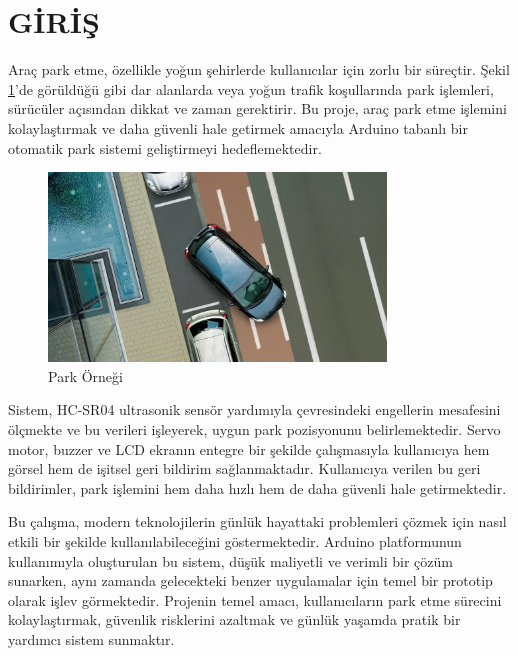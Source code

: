 \section{GİRİŞ}
    Araç park etme, özellikle yoğun şehirlerde kullanıcılar için zorlu bir süreçtir. Şekil \ref{fig:5}'de görüldüğü gibi dar alanlarda veya yoğun trafik koşullarında park işlemleri, sürücüler açısından dikkat ve zaman gerektirir. Bu proje, araç park etme işlemini kolaylaştırmak ve daha güvenli hale getirmek amacıyla Arduino tabanlı bir otomatik park sistemi geliştirmeyi hedeflemektedir.

\begin{figure}[H]
\centering
\includegraphics[width=0.80\textwidth]{Resimler/5.png}
\caption{Park Örneği}
\label{fig:5}
\end{figure}

    Sistem, HC-SR04 ultrasonik sensör yardımıyla çevresindeki engellerin mesafesini ölçmekte ve bu verileri işleyerek, uygun park pozisyonunu belirlemektedir. Servo motor, buzzer ve LCD ekranın entegre bir şekilde çalışmasıyla kullanıcıya hem görsel hem de işitsel geri bildirim sağlanmaktadır. Kullanıcıya verilen bu geri bildirimler, park işlemini hem daha hızlı hem de daha güvenli hale getirmektedir.

    Bu çalışma, modern teknolojilerin günlük hayattaki problemleri çözmek için nasıl etkili bir şekilde kullanılabileceğini göstermektedir. Arduino platformunun kullanımıyla oluşturulan bu sistem, düşük maliyetli ve verimli bir çözüm sunarken, aynı zamanda gelecekteki benzer uygulamalar için temel bir prototip olarak işlev görmektedir. Projenin temel amacı, kullanıcıların park etme sürecini kolaylaştırmak, güvenlik risklerini azaltmak ve günlük yaşamda pratik bir yardımcı sistem sunmaktır.

    